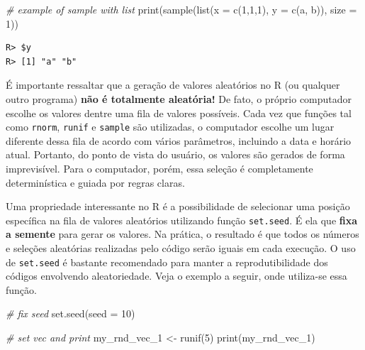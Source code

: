 \documentclass[
  11pt,
]{book}
\newenvironment{Shaded}{\begin{snugshade}}{\end{snugshade}}
\newcommand{\AttributeTok}[1]{\textcolor[rgb]{0.61,0.61,0.61}{#1}}
\newcommand{\CommentTok}[1]{\textcolor[rgb]{0.37,0.37,0.37}{\textit{#1}}}
\newcommand{\DecValTok}[1]{\textcolor[rgb]{0.06,0.06,0.06}{#1}}
\newcommand{\FunctionTok}[1]{\textcolor[rgb]{0,0,0}{#1}}
\newcommand{\NormalTok}[1]{#1}
\newcommand{\OtherTok}[1]{\textcolor[rgb]{0.37,0.37,0.37}{#1}}
\newcommand{\StringTok}[1]{\textcolor[rgb]{0.5,0.5,0.5}{#1}}
\begin{document}
\begin{Shaded}
\begin{Highlighting}[]
\CommentTok{\# example of sample with list}
\FunctionTok{print}\NormalTok{(}\FunctionTok{sample}\NormalTok{(}\FunctionTok{list}\NormalTok{(}\AttributeTok{x =} \FunctionTok{c}\NormalTok{(}\DecValTok{1}\NormalTok{,}\DecValTok{1}\NormalTok{,}\DecValTok{1}\NormalTok{),}
                  \AttributeTok{y =} \FunctionTok{c}\NormalTok{(}\StringTok{\textquotesingle{}a\textquotesingle{}}\NormalTok{, }\StringTok{\textquotesingle{}b\textquotesingle{}}\NormalTok{)),}
             \AttributeTok{size =} \DecValTok{1}\NormalTok{))}
\end{Highlighting}
\end{Shaded}

\begin{verbatim}
R> $y
R> [1] "a" "b"
\end{verbatim}

É importante ressaltar que a geração de valores aleatórios no R (ou qualquer outro programa) \textbf{não é totalmente aleatória!} De fato, o próprio computador escolhe os valores dentre uma fila de valores possíveis. Cada vez que funções tal como \texttt{rnorm}, \texttt{runif} e \texttt{sample} são utilizadas, o computador escolhe um lugar diferente dessa fila de acordo com vários parâmetros, incluindo a data e horário atual. Portanto, do ponto de vista do usuário, os valores são gerados de forma imprevisível. Para o computador, porém, essa seleção é completamente determinística e guiada por regras claras.

Uma propriedade interessante no R é a possibilidade de selecionar uma posição específica na fila de valores aleatórios utilizando função \texttt{set.seed}. É ela que \textbf{fixa a semente} para gerar os valores. Na prática, o resultado é que todos os números e seleções aleatórias realizadas pelo código serão iguais em cada execução. O uso de \texttt{set.seed} é bastante recomendado para manter a reprodutibilidade dos códigos envolvendo aleatoriedade. Veja o exemplo a seguir, onde utiliza-se essa função. 

\begin{Shaded}
\begin{Highlighting}[]
\CommentTok{\# fix seed}
\FunctionTok{set.seed}\NormalTok{(}\AttributeTok{seed =} \DecValTok{10}\NormalTok{)}

\CommentTok{\# set vec and print}
\NormalTok{my\_rnd\_vec\_1 }\OtherTok{\textless{}{-}} \FunctionTok{runif}\NormalTok{(}\DecValTok{5}\NormalTok{)}
\FunctionTok{print}\NormalTok{(my\_rnd\_vec\_1)}
\end{Highlighting}
\end{Shaded}
\end{document}
